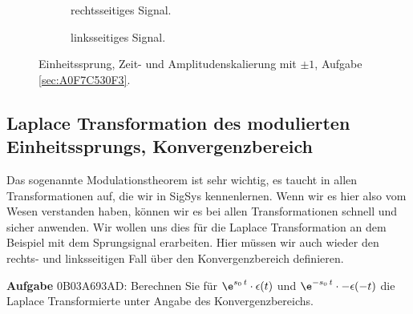 \begin{figure*}[h!]
\begin{subfigure}{0.45\textwidth}
\caption{rechtsseitiges Signal.}
\end{subfigure}
%
\begin{subfigure}{0.45\textwidth}
\caption{linksseitiges Signal.}
\end{subfigure}
%
%
%
\caption{Einheitssprung, Zeit- und Amplitudenskalierung mit $\pm 1$,
Aufgabe \ref{sec:A0F7C530F3}.}
\label{fig:A0F7C530F3}
\end{figure*}




\clearpage
\subsection{Laplace Transformation des modulierten Einheitssprungs,
Konvergenzbereich}
\label{sec:0B03A693AD}
\begin{Ziel}
Das sogenannte Modulationstheorem ist sehr wichtig, es taucht in allen Transformationen auf, die wir in SigSys kennenlernen. Wenn wir es hier also vom Wesen verstanden haben, können wir es bei allen Transformationen schnell und sicher anwenden.
Wir wollen uns dies für die Laplace Transformation an dem Beispiel mit dem Sprungsignal erarbeiten.
Hier müssen wir auch wieder den rechts- und linksseitigen Fall über den
Konvergenzbereich definieren.
\end{Ziel}
\textbf{Aufgabe} {\tiny 0B03A693AD}: Berechnen Sie für $\e^{s_0 \, t} \cdot \epsilon(t)$
und $\e^{-s_0 \, t} \cdot -\epsilon(-t)$ die Laplace Transformierte unter Angabe
des Konvergenzbereichs.

